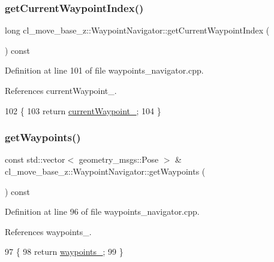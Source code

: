 \subsubsection{\texorpdfstring{get\+Current\+Waypoint\+Index()}{getCurrentWaypointIndex()}}
{\footnotesize\ttfamily long cl\+\_\+move\+\_\+base\+\_\+z\+::\+Waypoint\+Navigator\+::get\+Current\+Waypoint\+Index (\begin{DoxyParamCaption}{ }\end{DoxyParamCaption}) const}



Definition at line 101 of file waypoints\+\_\+navigator.\+cpp.



References current\+Waypoint\+\_\+.


\begin{DoxyCode}
102 \{
103   \textcolor{keywordflow}{return} \hyperlink{classcl__move__base__z_1_1WaypointNavigator_a82859e418592c2392c20a2d11b9836eb}{currentWaypoint\_};
104 \}
\end{DoxyCode}
\mbox{\label{classcl__move__base__z_1_1WaypointNavigator_a553cdd4ddc20ff26c1bdcb6dad42911f}} 
\subsubsection{\texorpdfstring{get\+Waypoints()}{getWaypoints()}}
{\footnotesize\ttfamily const std\+::vector$<$ geometry\+\_\+msgs\+::\+Pose $>$ \& cl\+\_\+move\+\_\+base\+\_\+z\+::\+Waypoint\+Navigator\+::get\+Waypoints (\begin{DoxyParamCaption}{ }\end{DoxyParamCaption}) const}



Definition at line 96 of file waypoints\+\_\+navigator.\+cpp.



References waypoints\+\_\+.


\begin{DoxyCode}
97 \{
98   \textcolor{keywordflow}{return} \hyperlink{classcl__move__base__z_1_1WaypointNavigator_a727f6a73e15ff5dc6bb3ffdf52c3d832}{waypoints\_};
99 \}
\end{DoxyCode}
\mbox{\label{classcl__move__base__z_1_1WaypointNavigator_a59d86da5ba9130cbed6e609b39474a9b}} 

